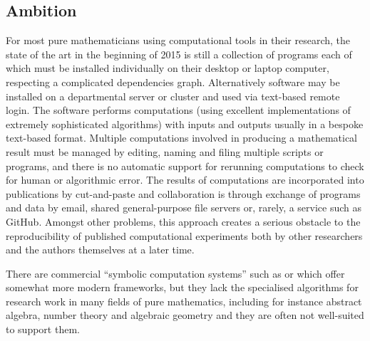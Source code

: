 \subsection{Ambition}





For most pure mathematicians using computational tools in their
research, the state of the art in the beginning of 2015 is still a collection of
programs each of which must be installed individually on their
desktop or laptop computer, respecting a complicated dependencies graph.
Alternatively software may be installed on a
departmental server or cluster and used via text-based remote
login. The software performs computations (using excellent
implementations of extremely sophisticated algorithms) with inputs and
outputs usually in a bespoke text-based format. 
Multiple computations involved in producing a mathematical
result must be managed by editing, naming and filing multiple scripts
or programs, and there is no automatic support for rerunning
computations to check for human or algorithmic error. The results of
computations are incorporated into publications by cut-and-paste and
collaboration is through exchange of programs and data by email,
shared general-purpose file servers or, rarely, a service such as
GitHub. Amongst other problems,  this approach creates a serious obstacle to the reproducibility
of published computational experiments both by other researchers and
the authors themselves at a later time.

There are commercial ``symbolic computation systems'' such as
\Mathematica or \Maple which offer somewhat more modern frameworks, but
they lack the specialised algorithms for research work in many fields
of pure mathematics, including for instance
abstract algebra, number theory and algebraic geometry and they
are often not well-suited to support them. 

